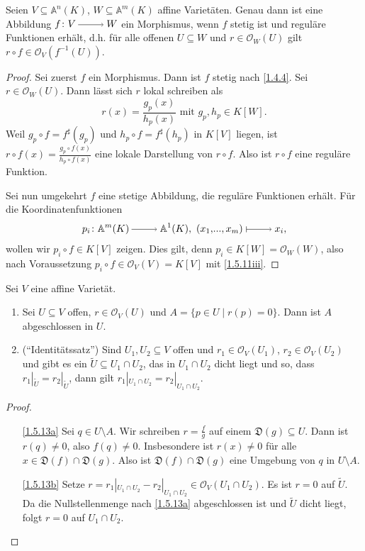 \documentclass[a4paper,12pt,index=toc]{scrbook}
\theoremstyle{keinenummern} %
\def\A{\mathbb{A}}
\def\O{\mathcal{O}}
\newcommand{\D}{\mathfrak{D}}
\newcommand{\restrict}[1]{|_{#1}}
\renewcommand{\dotsc}{\ensuremath{\!...}}
\newcommand{\schlange}[1]{\widetilde{#1}}
\begin{document}
\begin{prop}\label{1.5.12}
  Seien $V\subseteq\A^n(K)$, $W\subseteq\A^m(K)$ affine Varietäten. Genau dann ist eine Abbildung $f\colon V\ra W$ ein
  Morphismus, wenn $f$ stetig ist und reguläre Funktionen erhält, d.h. für alle offenen $U\subseteq W$ und $r\in\O_W(U)$ gilt
  $r\circ f\in\O_V(f^{-1}(U))$.
\end{prop}
\begin{proof}
  Sei zuerst $f$ ein Morphismus. Dann ist $f$ stetig nach \cref{1.4.4}. Sei $r\in\O_W(U)$. Dann lässt sich $r$ lokal
  schreiben als \begin{equation*}r(x)=\frac{g_p(x)}{h_p(x)}\text{ mit }g_p,h_p\in K[W].\end{equation*} Weil $g_p\circ f=f^\sharp(g_p)$ und $h_p\circ
  f=f^\sharp(h_p)$ in $K[V]$ liegen, ist $r\circ f(x)=\frac{g_p\circ f(x)}{h_p\circ f(x)}$ eine lokale Darstellung von
  $r\circ f$. Also ist $r\circ f$ eine reguläre Funktion.

  Sei nun umgekehrt $f$ eine stetige Abbildung, die reguläre Funktionen erhält. Für die Koordinatenfunktionen \begin{equation*}p_i\colon
  \A^m(K)\ra \A^1(K),\ (x_1,\dotsc,x_m)\mapsto x_i,\end{equation*} wollen wir $p_i\circ f\in K[V]$ zeigen. Dies gilt, denn $p_i\in K[W] =
  \O_W(W)$, also nach Voraussetzung $p_i\circ f\in\O_V(V)=K[V]$ mit \cref{1.5.11iii}.
\end{proof}

\begin{bem}\label{1.5.13}
  Sei $V$ eine affine Varietät.
  \begin{enumerate}
  \item{} Sei $U\subseteq V$ offen, $r\in\O_V(U)$ und $A=\{p\in U\mid r(p)=0\}$. Dann ist $A$ abgeschlossen in $U$.
  \item{} (\enquote{Identitätssatz}) Sind $U_{1}, U_{2}\subseteq V$ offen und $r_1\in\O_V(U_1)$, $r_2\in\O_V(U_2)$ und gibt es ein $\schlange{U}\subseteq
    U_1\cap U_2$, das in $U_1\cap U_2$ dicht liegt und so, dass $r_1\restrict{\schlange{U}}=r_2\restrict{\schlange{U}}$, dann gilt
    $r_1\restrict{U_1\cap U_2}=r_2\restrict{U_1\cap U_2}$.
  \end{enumerate}
\end{bem}
\begin{proof}
  \begin{enumerate}
  \item[\ref{1.5.13a}] Sei $q\in U\setminus A$. Wir schreiben $r=\frac{f}{g}$ auf einem $\D(g)\subseteq U$. Dann ist $r(q)\neq0$,
    also $f(q)\neq0$. Insbesondere ist $r(x)\neq0$ für alle $x\in \D(f)\cap \D(g)$. Also ist $\D(f)\cap \D(g)$ eine Umgebung von $q$
    in $U\setminus A$.
  \item[\ref{1.5.13b}] Setze $r=r_1\restrict{U_1\cap U_2}-r_2\restrict{U_1\cap U_2}\in \O_V(U_1\cap U_2)$. Es ist $r=0$ auf
    $\schlange{U}$. Da die Nullstellenmenge nach \ref{1.5.13a} abgeschlossen ist und $\schlange{U}$ dicht liegt, folgt $r=0$ auf $U_1\cap U_2$.
  \end{enumerate}
\end{proof}
\end{document}
